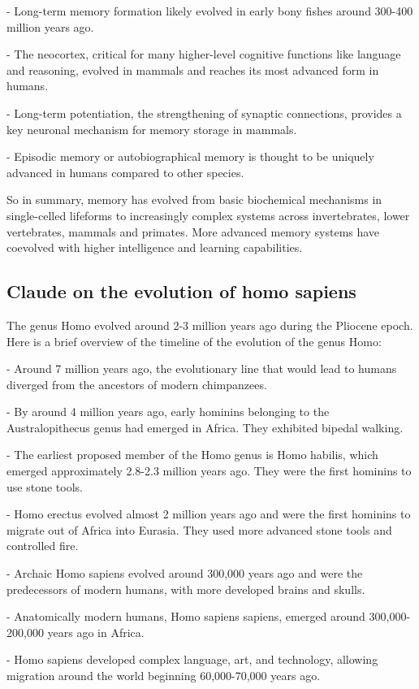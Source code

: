 \documentclass[10pt,titlepage]{book}
\begin{document}
- Long-term memory formation likely evolved in early bony fishes around 300-400 million years ago.

- The neocortex, critical for many higher-level cognitive functions like language and reasoning, evolved in mammals and reaches its most advanced form in humans.

- Long-term potentiation, the strengthening of synaptic connections, provides a key neuronal mechanism for memory storage in mammals.

- Episodic memory or autobiographical memory is thought to be uniquely advanced in humans compared to other species. 

So in summary, memory has evolved from basic biochemical mechanisms in single-celled lifeforms to increasingly complex systems across invertebrates, lower vertebrates, mammals and primates. More advanced memory systems have coevolved with higher intelligence and learning capabilities.

\subsection{Claude on the evolution of homo sapiens}

The genus Homo evolved around 2-3 million years ago during the Pliocene epoch. Here is a brief overview of the timeline of the evolution of the genus Homo:

- Around 7 million years ago, the evolutionary line that would lead to humans diverged from the ancestors of modern chimpanzees. 

- By around 4 million years ago, early hominins belonging to the Australopithecus genus had emerged in Africa. They exhibited bipedal walking.

- The earliest proposed member of the Homo genus is Homo habilis, which emerged approximately 2.8-2.3 million years ago. They were the first hominins to use stone tools.

- Homo erectus evolved almost 2 million years ago and were the first hominins to migrate out of Africa into Eurasia. They used more advanced stone tools and controlled fire.

- Archaic Homo sapiens evolved around 300,000 years ago and were the predecessors of modern humans, with more developed brains and skulls. 

- Anatomically modern humans, Homo sapiens sapiens, emerged around 300,000-200,000 years ago in Africa. 

- Homo sapiens developed complex language, art, and technology, allowing migration around the world beginning 60,000-70,000 years ago.
\end{document}
